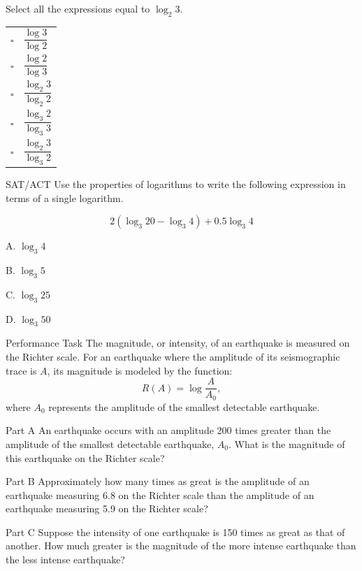 \documentclass{article}
\newenvironment{practice}[2]{}{}        %
\newcommand{\answer}[1]{}               %
\begin{document}
\begin{practice}{38}{1}
Select all the expressions equal to $\log_2 3$.

\begin{tabular}{ll}
$\square$ & $\dfrac{\log3}{\log2}$ \\
$\square$ & $\dfrac{\log2}{\log3}$ \\
$\square$ & $\dfrac{\log_2 3}{\log_2 2}$ \\
$\square$ & $\dfrac{\log_3 2}{\log_3 3}$ \\
$\square$ & $\dfrac{\log_2 3}{\log_3 2}$ \\
\end{tabular}

\answer{$\dfrac{\log3}{\log2}$ and $\dfrac{\log_2 3}{\log_2 2}$}
\end{practice}

\begin{practice}{39}{1}
SAT/ACT Use the properties of logarithms to write the following expression in terms of a single logarithm.

\[
2(\log_3 20-\log_3 4)+0.5\log_3 4
\]

A. $\log_3 4$

B. $\log_3 5$

C. $\log_3 25$

D. $\log_3 50$

\answer{$\log_3 50$}
\end{practice}

\begin{practice}{40}{2}
Performance Task The magnitude, or intensity, of an earthquake is measured on the Richter scale. For an earthquake where the amplitude of its seismographic trace is $A$, its magnitude is modeled by the function:
\[
R(A)=\log\frac{A}{A_0},
\]
where $A_0$ represents the amplitude of the smallest detectable earthquake.

Part A An earthquake occurs with an amplitude 200 times greater than the amplitude of the smallest detectable earthquake, $A_0$. What is the magnitude of this earthquake on the Richter scale?

Part B Approximately how many times as great is the amplitude of an earthquake measuring 6.8 on the Richter scale than the amplitude of an earthquake measuring 5.9 on the Richter scale?

Part C Suppose the intensity of one earthquake is 150 times as great as that of another. How much greater is the magnitude of the more intense earthquake than the less intense earthquake?

\answer{Part A 2.3; Part B $10^{0.9}$, or about 7.94, times greater; Part C The magnitude of the more intense earthquake is about 2.2 greater than the magnitude of the less intense earthquake.}
\end{practice}
\end{document}
